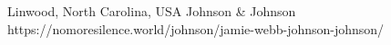           {Linwood, North Carolina, USA}
          {}
          {Johnson \& Johnson}
          {}
          {
          }
          {https://nomoresilence.world/johnson/jamie-webb-johnson-johnson/}



